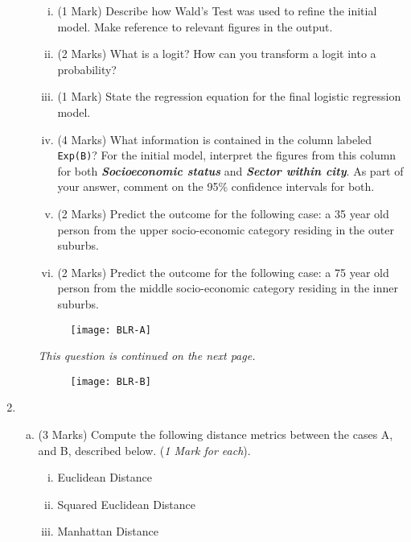\documentclass[a4paper,12pt]{article}
\begin{document}
\begin{enumerate}
\begin{enumerate}[(a)]
\begin{enumerate}[(i)]
\item (1 Mark) Describe how Wald's Test was used to refine the initial model. Make reference to relevant figures in the output.
\item (2 Marks)
What is a logit? How can you transform a logit into a probability?

\item (1 Mark) State the regression equation for the final logistic regression model.
\item (4 Marks) What information is contained in the column labeled \texttt{Exp(B)}? For the initial model, interpret the figures from this column for both \textbf{\textit{Socioeconomic status}} and \textbf{\textit{Sector within city}}. 
As part of your answer, comment on the 95\% confidence intervals for both.


\item (2 Marks) Predict the outcome for the following case: a 35 year old person from the upper socio-economic category residing in the outer suburbs.
\item (2 Marks) Predict the outcome for the following case: a 75 year old person  from the middle socio-economic category residing in the inner suburbs.

\end{enumerate}

\begin{figure}[h!]
	\centering

\texttt{[image: BLR-A]}\\

\end{figure}

\noindent \textit{This question is continued on the next page.}
\begin{figure}[h!]
	\centering

	\texttt{[image: BLR-B]}\\
	
\end{figure}


\end{enumerate}
\newpage


	\item 
	\begin{enumerate}[(a)]
		\item (3 Marks)  Compute the following distance metrics between the cases A, and B, described below. (\textit{1 Mark for each}).
		\begin{enumerate}[(i)]
		\item Euclidean Distance
		\item Squared Euclidean Distance
		\item Manhattan Distance
		

\end{enumerate}
\end{enumerate}
\end{enumerate}
\end{document}
